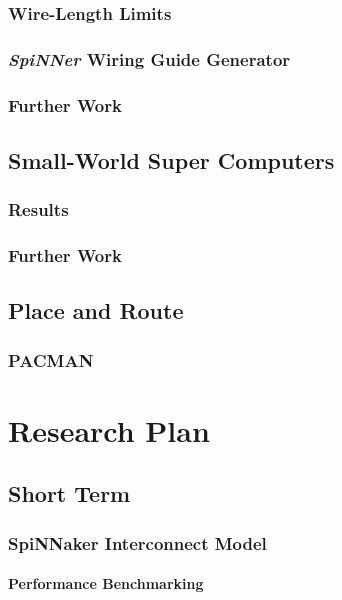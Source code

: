 \documentclass[a4paper,11pt,titlepage]{report}
\begin{document}
			\subsection{Wire-Length Limits}
			
			\subsection{\emph{SpiNNer} Wiring Guide Generator}
			
			\subsection{Further Work}
		
		\section{Small-World Super Computers}
			
			\subsection{Results}
			
			\subsection{Further Work}
		
		\section{Place and Route}
			
			\subsection{PACMAN}
	
	
	\chapter{Research Plan}
	
		\section{Short Term}
			
			\subsection{SpiNNaker Interconnect Model}
			
				\subsubsection{Performance Benchmarking}
				
\end{document}

